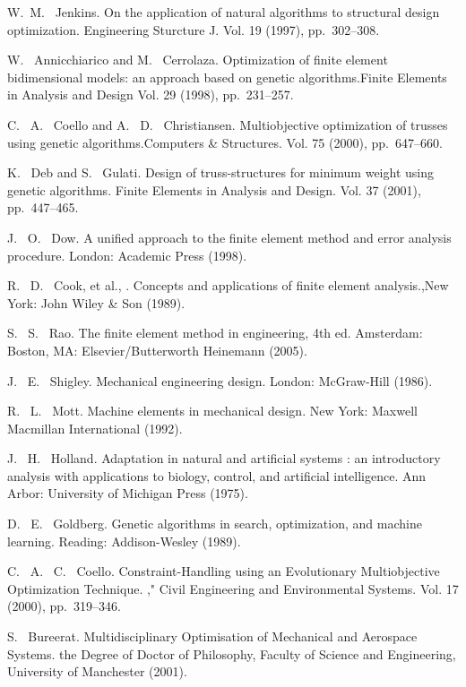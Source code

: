 
\begin{thebibliography}{10}
{\sc W.~M.~ Jenkins}. {On the application of natural algorithms to structural design optimization}. Engineering Sturcture J.  Vol. 19 (1997), pp.~302--308.

{\sc W. ~Annicchiarico and M. ~Cerrolaza}. {Optimization of finite element bidimensional models: an approach based on genetic algorithms}.Finite Elements in Analysis and Design  Vol. 29 (1998), pp.~231--257.

{\sc C. ~A. ~Coello and A. ~D. ~Christiansen}. {Multiobjective optimization of trusses using genetic algorithms}.Computers \& Structures. Vol. 75 (2000), pp.~647--660.

{\sc K. ~Deb and S. ~Gulati}. {Design of truss-structures for minimum weight using genetic algorithms}. Finite Elements in Analysis and Design. Vol. 37 (2001), pp.~447--465.

{\sc J. ~O. ~Dow}. {A unified approach to the finite element method and error analysis procedure}. London: Academic Press (1998).

{\sc R. ~D. ~Cook, et al., }. {Concepts and applications of finite element analysis}.,New York: John Wiley \& Son (1989).

{\sc S. ~S. ~Rao}. {The finite element method in engineering, 4th ed}. Amsterdam: Boston, MA: Elsevier/Butterworth Heinemann (2005).

{\sc J. ~E. ~Shigley}. {Mechanical engineering design.} London: McGraw-Hill (1986).

{\sc R. ~L. ~Mott}. {Machine elements in mechanical design}. New York: Maxwell Macmillan International (1992).

{\sc J. ~H. ~Holland}. {Adaptation in natural and artificial systems : an introductory analysis with applications to biology, control, and artificial intelligence}. Ann Arbor: University of Michigan Press (1975).

{\sc D. ~E. ~Goldberg}. {Genetic algorithms in search, optimization, and machine learning}. Reading: Addison-Wesley (1989).

{\sc C. ~A. ~C. ~Coello}. {Constraint-Handling using an Evolutionary Multiobjective Optimization Technique}. ," Civil Engineering and Environmental Systems. Vol. 17 (2000), pp.~319--346.

{\sc S. ~Bureerat}. {Multidisciplinary Optimisation of Mechanical and Aerospace Systems}. the Degree of Doctor of Philosophy, Faculty of Science and Engineering, University of Manchester (2001).
\end{thebibliography}